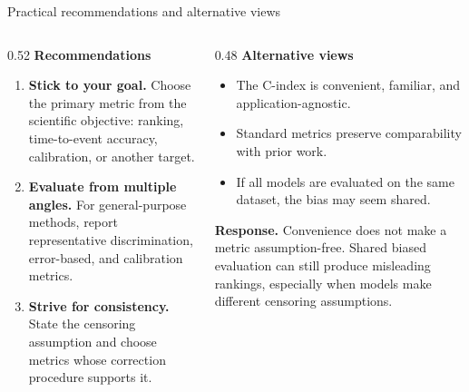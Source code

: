 \begin{frame}{Practical recommendations and alternative views}\small
\begin{columns}[T]
  \begin{column}{0.52\textwidth}
    \textbf{Recommendations}
    \begin{enumerate}
      \item \textbf{Stick to your goal.} Choose the primary metric from the scientific objective: ranking, time-to-event accuracy, calibration, or another target.
      \item \textbf{Evaluate from multiple angles.} For general-purpose methods, report representative discrimination, error-based, and calibration metrics.
      \item \textbf{Strive for consistency.} State the censoring assumption and choose metrics whose correction procedure supports it.
    \end{enumerate}
  \end{column}

  \begin{column}{0.48\textwidth}
    \textbf{Alternative views}
    \begin{itemize}
      \item The C-index is convenient, familiar, and application-agnostic.
      \item Standard metrics preserve comparability with prior work.
      \item If all models are evaluated on the same dataset, the bias may seem shared.
    \end{itemize}

    \vspace{0.4em}
    \textbf{Response.} Convenience does not make a metric assumption-free. Shared biased evaluation can still produce misleading rankings, especially when models make different censoring assumptions.
  \end{column}
\end{columns}
\end{frame}

